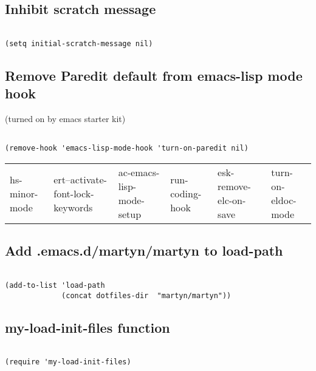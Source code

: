 \documentclass[colorlinks=true,urlcolor=blue,listings-sv]{article}
\begin{document}
\subsection{Inhibit scratch message}
\label{sec-1-16}



\lstset{language=Lisp}
\begin{lstlisting}

(setq initial-scratch-message nil)
\end{lstlisting}
\subsection{Remove Paredit default from emacs-lisp mode hook}
\label{sec-1-17}

(turned on by emacs starter kit)


\lstset{language=Lisp}
\begin{lstlisting}

(remove-hook 'emacs-lisp-mode-hook 'turn-on-paredit nil)
\end{lstlisting}


\begin{center}
\begin{tabular}{llllll}
 hs-minor-mode  &  ert--activate-font-lock-keywords  &  ac-emacs-lisp-mode-setup  &  run-coding-hook  &  esk-remove-elc-on-save  &  turn-on-eldoc-mode  \\
\end{tabular}
\end{center}


     
\subsection{Add .emacs.d/martyn/martyn to load-path}
\label{sec-1-18}



\lstset{language=Lisp}
\begin{lstlisting}

(add-to-list 'load-path
             (concat dotfiles-dir  "martyn/martyn"))
\end{lstlisting}
\subsection{my-load-init-files function}
\label{sec-1-19}



\lstset{language=Lisp}
\begin{lstlisting}

(require 'my-load-init-files)
\end{lstlisting}
\end{document}
